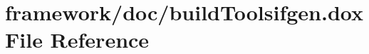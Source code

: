 \hypertarget{build_toolsifgen_8dox}{}\section{framework/doc/build\+Toolsifgen.dox File Reference}
\label{build_toolsifgen_8dox}
